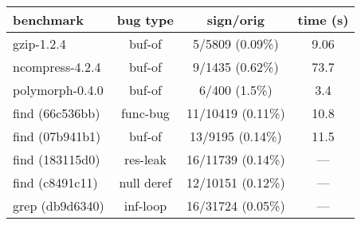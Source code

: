 \documentclass[11pt,english,titlepage]{article}
\begin{document}
\begin{table}[htb]
  \centering
  \begin{tabular}{l||c|c|c}
    \hline
    benchmark & bug type & sign/orig & time (s)\\
    \hline\hline
    gzip-1.2.4 & buf-of & 5/5809 (0.09\%) &  9.06\\
    ncompress-4.2.4 & buf-of & 9/1435 (0.62\%) & 73.7\\
    polymorph-0.4.0 & buf-of& 6/400 (1.5\%)& 3.4 \\
    find (66c536bb) & func-bug & 11/10419 (0.11\%) &10.8\\
    find (07b941b1) & buf-of & 13/9195 (0.14\%) &11.5\\
    find (183115d0) & res-leak & 16/11739 (0.14\%) & --- \\
    find (c8491c11) & null deref & 12/10151 (0.12\%) & ---\\
    grep (db9d6340) & inf-loop & 16/31724 (0.05\%) &---\\
    \hline
  \end{tabular}
\end{table}
\end{document}
